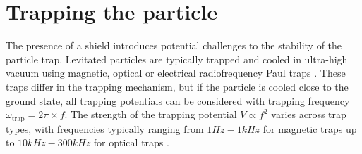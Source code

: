\section{Trapping the particle}\label{sec:4:trapping}
The presence of a shield introduces potential challenges to the stability of the particle trap. 
Levitated particles are typically trapped and cooled in ultra-high vacuum using magnetic, optical or electrical radiofrequency Paul traps \cite{GonzalezBallestero_2021}.
These traps differ in the trapping mechanism, but if the particle is cooled close to the ground state, all trapping potentials can be considered  with trapping frequency $\omega_\mathrm{trap} = 2\pi \times f$.
The strength of the trapping potential $V \propto f^2$ varies across trap types, with frequencies typically ranging from $1\si{Hz}-1\si{kHz}$ for magnetic traps \cite{Slezak_2018} up to $10\si{kHz}-300\si{kHz}$ for optical traps \cite{GonzalezBallestero_2021}. 

